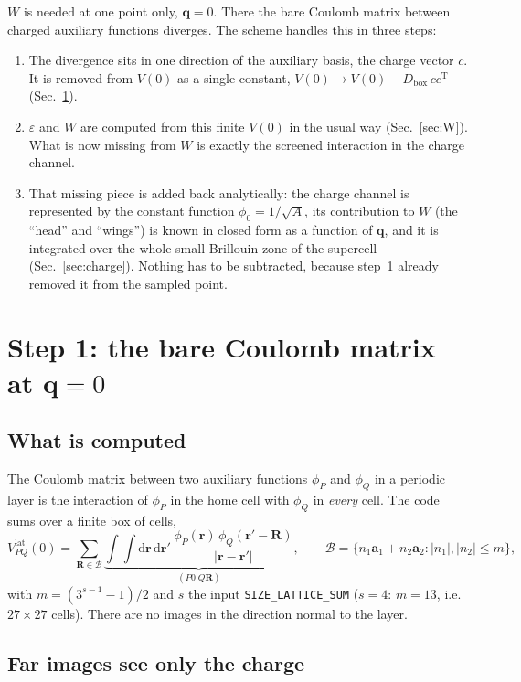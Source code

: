 \documentclass[11pt,a4paper]{article}
\newcommand{\br}{\mathbf{r}}
\newcommand{\bR}{\mathbf{R}}
\newcommand{\bq}{\mathbf{q}}
\newcommand{\dd}{\mathrm{d}}
\newcommand{\Tr}{\mathrm{T}}
\newcommand{\lat}{\mathrm{lat}}
\begin{document}
$W$ is needed at one point only, $\bq=0$. There the bare Coulomb matrix between charged
auxiliary functions diverges. The scheme handles this in three steps:
\begin{enumerate}
\item The divergence sits in one direction of the auxiliary basis, the charge vector $c$. It is
  removed from $V(0)$ as a single constant, $V(0)\to V(0)-D_\mathrm{box}\,cc^\Tr$
  (Sec.~\ref{sec:V}).
\item $\varepsilon$ and $W$ are computed from this finite $V(0)$ in the usual way
  (Sec.~\ref{sec:W}). What is now missing from $W$ is exactly the screened interaction in the
  charge channel.
\item That missing piece is added back analytically: the charge channel is represented by the
  constant function $\phi_0 = 1/\sqrt A$, its contribution to $W$ (the ``head'' and ``wings'')
  is known in closed form as a function of $\bq$, and it is integrated over the whole small
  Brillouin zone of the supercell (Sec.~\ref{sec:charge}). Nothing has to be subtracted,
  because step~1 already removed it from the sampled point.
\end{enumerate}

\section{Step 1: the bare Coulomb matrix at $\bq=0$}
\label{sec:V}

\subsection{What is computed}

The Coulomb matrix between two auxiliary functions $\phi_P$ and $\phi_Q$ in a periodic layer is
the interaction of $\phi_P$ in the home cell with $\phi_Q$ in \emph{every} cell. The code sums
over a finite box of cells,
\begin{equation}
  V^\lat_{PQ}(0) = \sum_{\bR\in\mathcal B}\underbrace{\int\!\!\int\dd\br\,\dd\br'\,
  \frac{\phi_P(\br)\,\phi_Q(\br'-\bR)}{|\br-\br'|}}_{(P0|Q\bR)},
  \qquad
  \mathcal B = \{n_1\mathbf a_1+n_2\mathbf a_2 : |n_1|,|n_2|\le m\},
  \label{eq:Vlat}
\end{equation}
with $m = (3^{s-1}-1)/2$ and $s$ the input \texttt{SIZE\_LATTICE\_SUM} ($s=4$: $m=13$, i.e.\
$27\times27$ cells). There are no images in the direction normal to the layer.

\subsection{Far images see only the charge}
\end{document}
